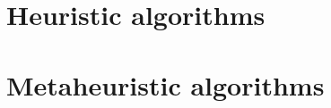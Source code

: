 \label{chap:os}



\section{Heuristic algorithms}
\label{sec:heuristic}


\section{Metaheuristic algorithms}
\label{sec:meta}


